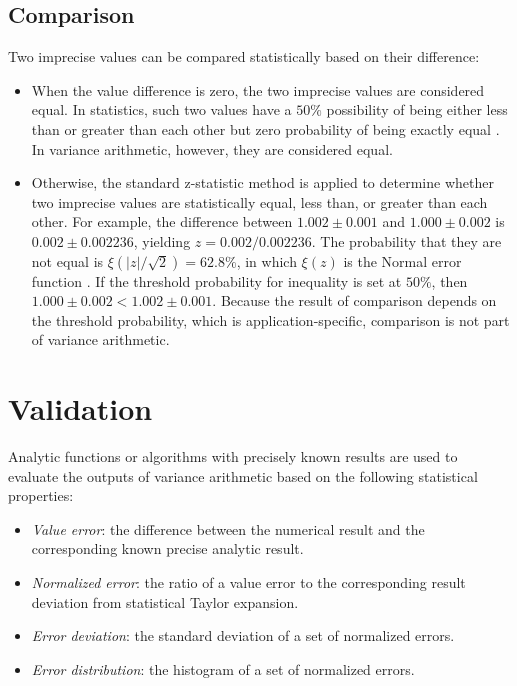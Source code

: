 \documentclass[twoside]{article}
\numberwithin{equation}{section}
\newcommand{\Verbose}{}
\begin{document}
\ifdefined\Verbose

\subsection{Comparison}


Two imprecise values can be compared statistically based on their difference:
\begin{itemize}
\item 
When the value difference is zero, the two imprecise values are considered equal.  
In statistics, such two values have a $50\%$ possibility of being either less than or greater than each other but zero probability of being exactly equal \cite{Probability_Statistics}.
In variance arithmetic, however, they are considered equal.

\item 
Otherwise, the standard z-statistic method \cite{Probability_Statistics} is applied to determine whether two imprecise values are statistically equal, less than, or greater than each other.
For example, the difference between $1.002 \pm 0.001$ and $1.000 \pm 0.002$ is $0.002 \pm 0.002236$, yielding $z = 0.002 / 0.002236$.
The probability that they are not equal is $\xi(|z|/\sqrt{2}) = 62.8\%$, in which $\xi(z)$ is the Normal error function \cite{Probability_Statistics}.
If the threshold probability for inequality is set at $50\%$, then $1.000 \pm 0.002 < 1.002 \pm 0.001$.
Because the result of comparison depends on the threshold probability, which is application-specific, comparison is not part of variance arithmetic.

\end{itemize}


\fi


\section{Validation}
\label{sec: validation}

Analytic functions or algorithms with precisely known results are used to evaluate the outputs of variance arithmetic based on the following statistical properties: 
\begin{itemize}

\item \emph{Value error}: the difference between the numerical result and the corresponding known precise analytic result.

\item \emph{Normalized error}: the ratio of a value error to the corresponding result deviation from statistical Taylor expansion.

\item \emph{Error deviation}: the standard deviation of a set of normalized errors.

\item \emph{Error distribution}: the histogram of a set of normalized errors.

\end{itemize}
\end{document}
